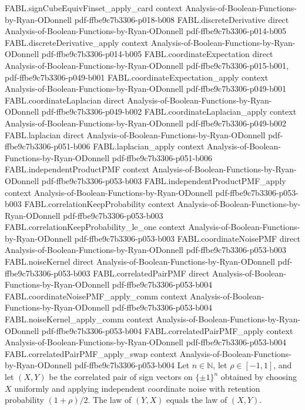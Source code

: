 \begin{theorem}
  {FABL.signCubeEquivFinset_apply_card}
  {context}
  {Analysis-of-Boolean-Functions-by-Ryan-ODonnell}
  {pdf-ffbe9c7b3306-p018-b008}
\proofstep
  {FABL.discreteDerivative}
  {direct}
  {Analysis-of-Boolean-Functions-by-Ryan-ODonnell}
  {pdf-ffbe9c7b3306-p014-b005}
\proofstep
  {FABL.discreteDerivative_apply}
  {context}
  {Analysis-of-Boolean-Functions-by-Ryan-ODonnell}
  {pdf-ffbe9c7b3306-p014-b005}
\proofstep
  {FABL.coordinateExpectation}
  {direct}
  {Analysis-of-Boolean-Functions-by-Ryan-ODonnell}
  {pdf-ffbe9c7b3306-p015-b001,
    pdf-ffbe9c7b3306-p049-b001}
\proofstep
  {FABL.coordinateExpectation_apply}
  {context}
  {Analysis-of-Boolean-Functions-by-Ryan-ODonnell}
  {pdf-ffbe9c7b3306-p049-b001}
\proofstep
  {FABL.coordinateLaplacian}
  {direct}
  {Analysis-of-Boolean-Functions-by-Ryan-ODonnell}
  {pdf-ffbe9c7b3306-p049-b002}
\proofstep
  {FABL.coordinateLaplacian_apply}
  {context}
  {Analysis-of-Boolean-Functions-by-Ryan-ODonnell}
  {pdf-ffbe9c7b3306-p049-b002}
\proofstep
  {FABL.laplacian}
  {direct}
  {Analysis-of-Boolean-Functions-by-Ryan-ODonnell}
  {pdf-ffbe9c7b3306-p051-b006}
\proofstep
  {FABL.laplacian_apply}
  {context}
  {Analysis-of-Boolean-Functions-by-Ryan-ODonnell}
  {pdf-ffbe9c7b3306-p051-b006}
\proofstep
  {FABL.independentProductPMF}
  {context}
  {Analysis-of-Boolean-Functions-by-Ryan-ODonnell}
  {pdf-ffbe9c7b3306-p053-b003}
\proofstep
  {FABL.independentProductPMF_apply}
  {context}
  {Analysis-of-Boolean-Functions-by-Ryan-ODonnell}
  {pdf-ffbe9c7b3306-p053-b003}
\proofstep
  {FABL.correlationKeepProbability}
  {context}
  {Analysis-of-Boolean-Functions-by-Ryan-ODonnell}
  {pdf-ffbe9c7b3306-p053-b003}
\proofstep
  {FABL.correlationKeepProbability_le_one}
  {context}
  {Analysis-of-Boolean-Functions-by-Ryan-ODonnell}
  {pdf-ffbe9c7b3306-p053-b003}
\proofstep
  {FABL.coordinateNoisePMF}
  {direct}
  {Analysis-of-Boolean-Functions-by-Ryan-ODonnell}
  {pdf-ffbe9c7b3306-p053-b003}
\proofstep
  {FABL.noiseKernel}
  {direct}
  {Analysis-of-Boolean-Functions-by-Ryan-ODonnell}
  {pdf-ffbe9c7b3306-p053-b003}
\proofstep
  {FABL.correlatedPairPMF}
  {direct}
  {Analysis-of-Boolean-Functions-by-Ryan-ODonnell}
  {pdf-ffbe9c7b3306-p053-b004}
\proofstep
  {FABL.coordinateNoisePMF_apply_comm}
  {context}
  {Analysis-of-Boolean-Functions-by-Ryan-ODonnell}
  {pdf-ffbe9c7b3306-p053-b004}
\proofstep
  {FABL.noiseKernel_apply_comm}
  {context}
  {Analysis-of-Boolean-Functions-by-Ryan-ODonnell}
  {pdf-ffbe9c7b3306-p053-b004}
\proofstep
  {FABL.correlatedPairPMF_apply}
  {context}
  {Analysis-of-Boolean-Functions-by-Ryan-ODonnell}
  {pdf-ffbe9c7b3306-p053-b004}
\proofstep
  {FABL.correlatedPairPMF_apply_swap}
  {context}
  {Analysis-of-Boolean-Functions-by-Ryan-ODonnell}
  {pdf-ffbe9c7b3306-p053-b004}
Let $n\in\mathbb N$, let $\rho\in[-1,1]$, and let $(X,Y)$ be the correlated pair of sign
vectors on $\{\pm1\}^n$ obtained by choosing $X$ uniformly and applying independent
coordinate noise with retention probability $(1+\rho)/2$. The law of $(Y,X)$ equals the
law of $(X,Y)$.
\end{theorem}

